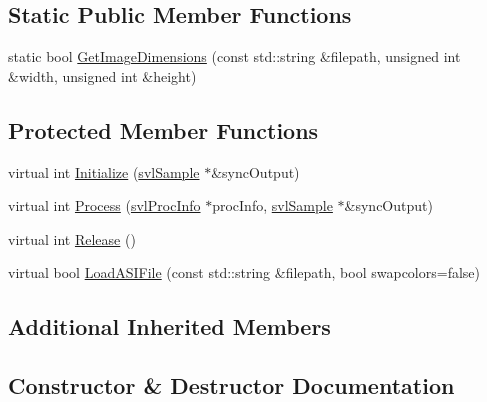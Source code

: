 \subsection*{Static Public Member Functions}
\begin{DoxyCompactItemize}
\item 
static bool \hyperlink{classsvl_filter_source3_d_sensor_file_a594e035fcd14a6f168963111cc3a23c6}{Get\+Image\+Dimensions} (const std\+::string \&filepath, unsigned int \&width, unsigned int \&height)
\end{DoxyCompactItemize}
\subsection*{Protected Member Functions}
\begin{DoxyCompactItemize}
\item 
virtual int \hyperlink{classsvl_filter_source3_d_sensor_file_ac1994fdb82f41d883eb701e47dd437dc}{Initialize} (\hyperlink{classsvl_sample}{svl\+Sample} $\ast$\&sync\+Output)
\item 
virtual int \hyperlink{classsvl_filter_source3_d_sensor_file_afed41820a644c470c964c1dde3f32910}{Process} (\hyperlink{structsvl_proc_info}{svl\+Proc\+Info} $\ast$proc\+Info, \hyperlink{classsvl_sample}{svl\+Sample} $\ast$\&sync\+Output)
\item 
virtual int \hyperlink{classsvl_filter_source3_d_sensor_file_a0291ce78fec02b9935a501cfa65d8cf1}{Release} ()
\item 
virtual bool \hyperlink{classsvl_filter_source3_d_sensor_file_a785f0025e95d4c805be9fb26a4afab86}{Load\+A\+S\+I\+File} (const std\+::string \&filepath, bool swapcolors=false)
\end{DoxyCompactItemize}
\subsection*{Additional Inherited Members}


\subsection{Constructor \& Destructor Documentation}
\hypertarget{classsvl_filter_source3_d_sensor_file_a6788eff6e16a3736c2f711ee91d4d53e}{}
